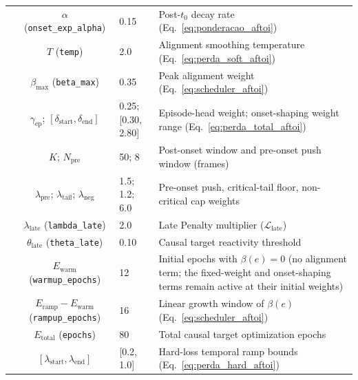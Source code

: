 \documentclass[a4paper,fleqn]{cas-dc}
\begin{document}
\begin{table}[!tbp]
\begin{tabularx}{\textwidth}{l c l X}
 & {\color{\revcolor}$\alpha$ (\texttt{onset\_exp\_alpha})} & {\color{\revcolor}0.15} & {\color{\revcolor}Post-$t_0$ decay rate (Eq.~\ref{eq:ponderacao_aftoi})} \\
 & {\color{\revcolor}$T$ (\texttt{temp})}            & {\color{\revcolor}2.0}  & {\color{\revcolor}Alignment smoothing temperature (Eq.~\ref{eq:perda_soft_aftoi})} \\
 & {\color{\revcolor}$\beta_{\max}$ (\texttt{beta\_max})} & {\color{\revcolor}0.35} & {\color{\revcolor}Peak alignment weight (Eq.~\ref{eq:scheduler_aftoi})} \\
 & {\color{\revcolor}$\gamma_{\mathrm{ep}}$; $[\delta_{\text{start}},\delta_{\text{end}}]$} & {\color{\revcolor}0.25; [0.30, 2.80]} & {\color{\revcolor}Episode-head weight; onset-shaping weight range (Eq.~\ref{eq:perda_total_aftoi})} \\
 & {\color{\revcolor}$K$; $N_{\text{pre}}$} & {\color{\revcolor}50; 8} & {\color{\revcolor}Post-onset window and pre-onset push window (frames)} \\
 & {\color{\revcolor}$\lambda_{\text{pre}}$; $\lambda_{\text{tail}}$; $\lambda_{\text{neg}}$} & {\color{\revcolor}1.5; 1.2; 6.0} & {\color{\revcolor}Pre-onset push, critical-tail floor, non-critical cap weights} \\
 & {\color{\revcolor}$\lambda_{\text{late}}$ (\texttt{lambda\_late})} & {\color{\revcolor}2.0} & {\color{\revcolor}Late Penalty multiplier ($\mathcal{L}_{\text{late}}$)} \\
 & {\color{\revcolor}$\theta_{\text{late}}$ (\texttt{theta\_late})}   & {\color{\revcolor}0.10} & {\color{\revcolor}Causal target reactivity threshold} \\
\midrule
{}
 & {\color{\revcolor}$E_{\text{warm}}$ (\texttt{warmup\_epochs})} & {\color{\revcolor}12} & {\color{\revcolor}Initial epochs with $\beta(e){=}0$ (no alignment term; the fixed-weight and onset-shaping terms remain active at their initial weights)} \\
 & {\color{\revcolor}$E_{\text{ramp}}{-}E_{\text{warm}}$ (\texttt{rampup\_epochs})}  & {\color{\revcolor}16} & {\color{\revcolor}Linear growth window of $\beta(e)$ (Eq.~\ref{eq:scheduler_aftoi})} \\
 & $E_{\text{total}}$ (\texttt{epochs})         & 80 & Total causal target optimization epochs \\
 & {\color{\revcolor}$[\lambda_{\text{start}}, \lambda_{\text{end}}]$} & {\color{\revcolor}[0.2, 1.0]} & {\color{\revcolor}Hard-loss temporal ramp bounds (Eq.~\ref{eq:perda_hard_aftoi})} \\
\bottomrule
\end{tabularx}
\end{table}
\end{document}
